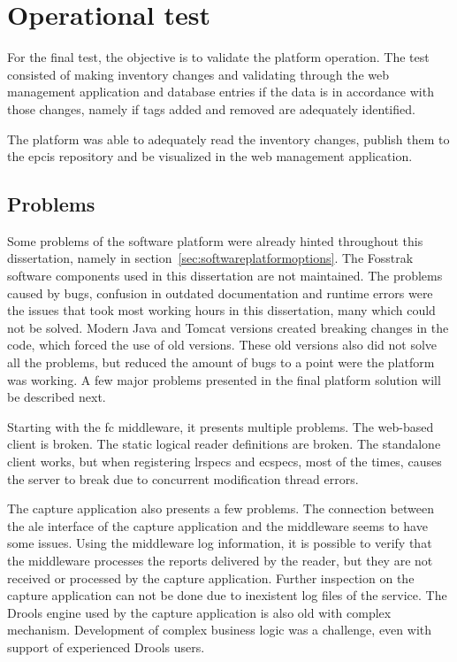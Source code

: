 \section{Operational test}

For the final test, the objective is to validate the platform operation.
The test consisted of making inventory changes and validating through the web management application and database entries if the data is in accordance with those changes, namely if tags added and removed are adequately identified.

The platform was able to adequately read the inventory changes, publish them to the \ac{epcis} repository and be visualized in the web management application.

\subsection{Problems}

Some problems of the software platform were already hinted throughout this dissertation, namely in section~\ref{sec:softwareplatformoptions}.
The Fosstrak software components used in this dissertation are not maintained. The problems caused by bugs, confusion in outdated documentation and runtime errors were the issues that took most working hours in this dissertation, many which could not be solved.
Modern Java and Tomcat versions created breaking changes in the code, which forced the use of old versions. 
These old versions also did not solve all the problems, but reduced the amount of bugs to a point were the platform was working. A few major problems presented in the final platform solution will be described next.

Starting with the \ac{fc} middleware, it presents multiple problems. 
The web-based client is broken. The static logical reader definitions are broken.
The standalone client works, but when registering \acp{lrspec} and \acp{ecspec}, most of the times, causes the server to break due to concurrent modification thread errors.

The capture application also presents a few problems.
The connection between the \ac{ale} interface of the capture application and the middleware seems to have some issues. Using the middleware log information, it is possible to verify that the middleware processes the reports delivered by the reader, but they are not received or processed by the capture application.
Further inspection on the capture application can not be done due to inexistent log files of the service.
The Drools engine used by the capture application is also old with complex mechanism. Development of complex business logic was a challenge, even with support of experienced Drools users.

